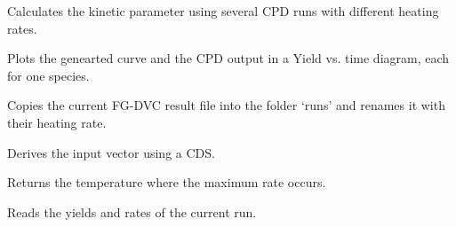 \documentclass[letterpaper,10pt,english]{sphinxmanual}
\begin{document}
\begin{fulllineitems}
\label{Appendix:CPD_Fit_lin_regr.ProcessCPD}
Calculates the kinetic parameter using several CPD runs with different heating rates.

\begin{fulllineitems}
\label{Appendix:CPD_Fit_lin_regr.ProcessCPD.CompareResults}
Plots the genearted curve and the CPD output in a Yield vs. time diagram, each for one species.

\end{fulllineitems}


\begin{fulllineitems}
\label{Appendix:CPD_Fit_lin_regr.ProcessCPD.CpFile}
Copies the current FG-DVC result file into the folder `runs' and renames it with their heating rate.

\end{fulllineitems}


\begin{fulllineitems}
\label{Appendix:CPD_Fit_lin_regr.ProcessCPD.Derive}
Derives the input vector using a CDS.

\end{fulllineitems}


\begin{fulllineitems}
\label{Appendix:CPD_Fit_lin_regr.ProcessCPD.MaxRateTemp}
Returns the temperature where the maximum rate occurs.

\end{fulllineitems}


\begin{fulllineitems}
\label{Appendix:CPD_Fit_lin_regr.ProcessCPD.ReadYields}
Reads the yields and rates of the current run.


\end{fulllineitems}
\end{fulllineitems}
\end{document}
